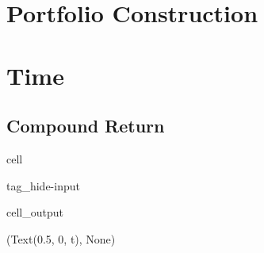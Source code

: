 \documentclass[letterpaper,10pt,english]{jupyterBook}
\begin{document}
\section{Portfolio Construction}
\label{\detokenize{ch/principles/intro_nb:portfolio-construction}}\label{\detokenize{ch/principles/intro_nb:fin-edu-principles-asset-allocation}}

\section{Time}
\label{\detokenize{ch/principles/intro_nb:time}}\label{\detokenize{ch/principles/intro_nb:fin-edu-principles-time}}

\subsection{Compound Return}
\label{\detokenize{ch/principles/intro_nb:compound-return}}\label{\detokenize{ch/principles/intro_nb:fin-edu-principles-time-compunding}}
\begin{sphinxuseclass}{cell}
\begin{sphinxuseclass}{tag_hide-input}\begin{sphinxVerbatimOutput}

\begin{sphinxuseclass}{cell_output}
\begin{sphinxVerbatim}[commandchars=\\\{\}]
(Text(0.5, 0, \PYGZsq{}t\PYGZsq{}), None)
\end{sphinxVerbatim}

\noindent{}

\end{sphinxuseclass}\end{sphinxVerbatimOutput}

\end{sphinxuseclass}
\end{sphinxuseclass}
\end{document}
